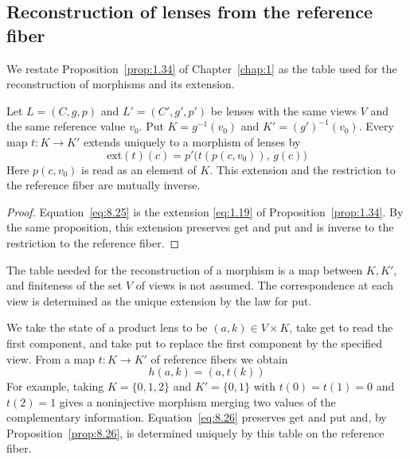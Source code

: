 \subsection*{Reconstruction of lenses from the reference fiber}

We restate Proposition~\ref{prop:1.34} of Chapter~\ref{chap:1} as the table used for the
reconstruction of morphisms and its extension.

\begin{proposition}\label{prop:8.26}

Let $L=(C,g,p)$ and $L'=(C',g',p')$ be lenses with the same views $V$ and the same reference
value $v_0$.
Put $K=g^{-1}(v_0)$ and $K'=(g')^{-1}(v_0)$.
Every map $t:K\to K'$ extends uniquely to a morphism of lenses by
\begin{equation*}
\mathrm{ext}(t)(c)
=
p'\bigl(t(p(c,v_0)),\,g(c)\bigr)
\tag{8.25}\label{eq:8.25}
\end{equation*}
Here $p(c,v_0)$ is read as an element of $K$.
This extension and the restriction to the reference fiber are mutually inverse.

\end{proposition}

\begin{proof}

Equation~\eqref{eq:8.25} is the extension \eqref{eq:1.19} of Proposition~\ref{prop:1.34}.
By the same proposition, this extension preserves get and put and is inverse to the
restriction to the reference fiber.

\end{proof}

The table needed for the reconstruction of a morphism is a map between $K,K'$, and finiteness
of the set $V$ of views is not assumed.
The correspondence at each view is determined as the unique extension by the law for put.

\begin{example}\label{ex:8.27}

We take the state of a product lens to be $(a,k)\in V\times K$, take get to read the first
component, and take put to replace the first component by the specified view.
From a map $t:K\to K'$ of reference fibers we obtain
\begin{equation*}
h(a,k)=(a,t(k))
\tag{8.26}\label{eq:8.26}
\end{equation*}
For example, taking $K=\{0,1,2\}$ and $K'=\{0,1\}$ with $t(0)=t(1)=0$ and $t(2)=1$ gives a
noninjective morphism merging two values of the complementary information.
Equation~\eqref{eq:8.26} preserves get and put and, by Proposition~\ref{prop:8.26}, is
determined uniquely by this table on the reference fiber.

\end{example}


